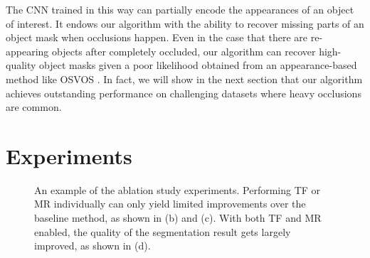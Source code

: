 \documentclass[10pt,twocolumn,letterpaper]{article}
\begin{document}
The CNN trained in this way can partially encode the appearances of an object of interest.
It endows our algorithm with the ability to recover missing parts of an object mask when occlusions happen.
Even in the case that there are re-appearing objects after completely occluded, our algorithm can recover high-quality
object masks given a poor likelihood obtained from an appearance-based method like OSVOS \cite{caelles2017one}.
In fact, we will show in the next section that our algorithm achieves outstanding performance on challenging datasets
where heavy occlusions are common.
























\section{Experiments}\label{sec.ourexperiments}

\begin{figure*}[!t]
    \vspace{-3mm}
    \centerline{
        }\vspace{-8pt}
    \caption{An example of the ablation study experiments.
    Performing TF or MR individually can only yield limited improvements over the baseline method, as shown in (b) and (c).
    With both TF and MR enabled, the quality of the segmentation result gets largely improved, as shown in (d).}
    \vspace{-4mm}
    \label{fig.ablationexample}
\end{figure*}
\end{document}

